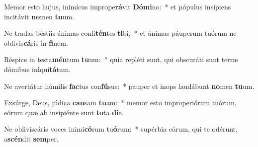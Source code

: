 \item Memor esto hujus, inimícus imprope\textbf{rá}vit \textbf{Dó}\textbf{mi}no:~* et pópulus insípiens incitávit \textbf{no}men \textbf{tu}um.
\item Ne tradas béstiis ánimas confi\textbf{tén}tes \textbf{ti}bi,~* et ánimas páuperum tuórum ne oblivis\textbf{cá}ris in \textbf{fi}nem.
\item Réspice in testa\textbf{mén}tum \textbf{tu}um:~* quia repléti sunt, qui obscuráti sunt terræ dómibus in\textbf{i}qui\textbf{tá}tum.
\item Ne avertátur húmilis \textbf{fac}tus con\textbf{fú}sus:~* pauper et inops laudábunt \textbf{no}men \textbf{tu}um.
\item Exsúrge, Deus, júdica \textbf{cau}sam \textbf{tu}am:~* memor esto improperiórum tuórum, eórum quæ ab insipiénte sunt \textbf{to}ta \textbf{di}e.
\item Ne obliviscáris voces inimi\textbf{có}rum tu\textbf{ó}rum:~* supérbia eórum, qui te odérunt, a\textbf{scén}dit \textbf{sem}per.
